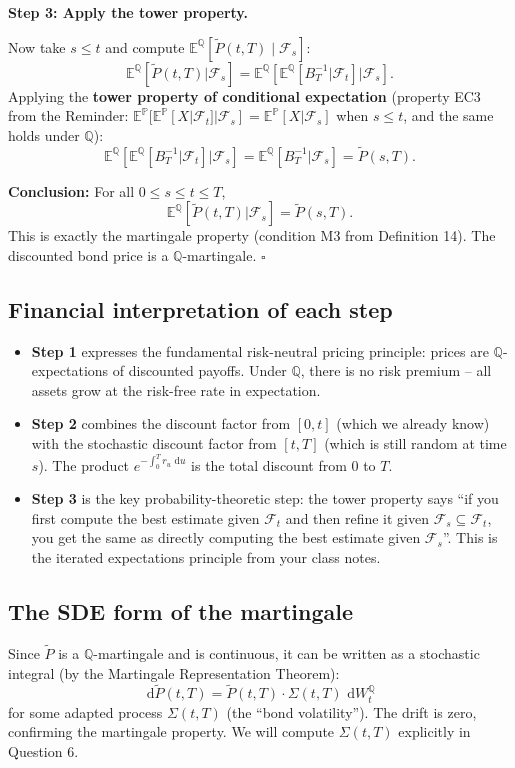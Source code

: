 \documentclass[11pt]{article}
\newcommand{\PP}{\mathbb{P}}
\newcommand{\QQ}{\mathbb{Q}}
\newcommand{\EE}{\mathbb{E}}
\newcommand{\FF}{\mathcal{F}}
\newcommand{\dd}{\,\mathrm{d}}
\begin{document}
\textbf{Step 3: Apply the tower property.}

Now take $s \le t$ and compute $\EE^\QQ[\widetilde{P}(t,T)\mid\FF_s]$:
\[
\EE^\QQ\!\left[\widetilde{P}(t,T)\bigg|\FF_s\right]
= \EE^\QQ\!\left[\EE^\QQ\!\left[B_T^{-1}\bigg|\FF_t\right]\bigg|\FF_s\right].
\]
Applying the \textbf{tower property of conditional expectation} (property EC3
from the Reminder: $\EE^\PP[\EE^\PP[X|\FF_t]|\FF_s] = \EE^\PP[X|\FF_s]$
when $s\le t$, and the same holds under $\QQ$):
\[
\EE^\QQ\!\left[\EE^\QQ\!\left[B_T^{-1}\bigg|\FF_t\right]\bigg|\FF_s\right]
= \EE^\QQ\!\left[B_T^{-1}\bigg|\FF_s\right]
= \widetilde{P}(s,T).
\]

\textbf{Conclusion:} For all $0 \le s \le t \le T$,
\[
\EE^\QQ\!\left[\widetilde{P}(t,T)\bigg|\FF_s\right] = \widetilde{P}(s,T).
\]
This is exactly the martingale property (condition M3 from Definition 14).
The discounted bond price is a $\QQ$-martingale. $\square$

\subsection{Financial interpretation of each step}

\begin{itemize}
  \item \textbf{Step 1} expresses the fundamental risk-neutral pricing
  principle: prices are $\QQ$-expectations of discounted payoffs.  Under $\QQ$,
  there is no risk premium -- all assets grow at the risk-free rate in
  expectation.
  \item \textbf{Step 2} combines the discount factor from $[0,t]$ (which we
  already know) with the stochastic discount factor from $[t,T]$ (which is
  still random at time $s$).  The product $e^{-\int_0^T r_u\,\dd u}$ is the
  total discount from $0$ to $T$.
  \item \textbf{Step 3} is the key probability-theoretic step: the tower
  property says ``if you first compute the best estimate given $\FF_t$ and
  then refine it given $\FF_s \subseteq \FF_t$, you get the same as directly
  computing the best estimate given $\FF_s$''.  This is the iterated
  expectations principle from your class notes.
\end{itemize}

\subsection{The SDE form of the martingale}

Since $\widetilde{P}$ is a $\QQ$-martingale and is continuous, it can be
written as a stochastic integral (by the Martingale Representation
Theorem):
\[
\dd\widetilde{P}(t,T) = \widetilde{P}(t,T)\cdot\Sigma(t,T)\,\dd W_t^\QQ
\]
for some adapted process $\Sigma(t,T)$ (the ``bond volatility'').  The
drift is zero, confirming the martingale property.  We will compute
$\Sigma(t,T)$ explicitly in Question 6.
\end{document}
